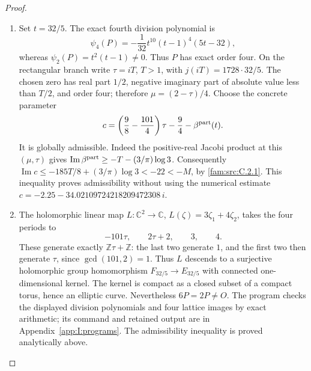 \begin{proof}
\begin{enumerate}[label=\arabic*.,leftmargin=*]
\item Set \(t=32/5\). The exact fourth division polynomial is
\[
 \psi_4(P)=-\frac1{32}t^{10}(t-1)^4(5t-32),
\]
whereas \(\psi_2(P)=t^2(t-1)\ne0\). Thus \(P\) has exact order four.
On the rectangular branch write \(\tau=iT\), \(T>1\), with
\(j(iT)=1728\cdot32/5\). The chosen zero has real part \(1/2\), negative
imaginary part of absolute value less than \(T/2\), and order four;
therefore \(\mu=(2-\tau)/4\). Choose the concrete parameter
\[
 c=\left(\frac98-\frac{101}{4}\right)\tau-\frac94
       -\beta^{\rm part}(t).
\]
It is globally admissible. Indeed the positive-real Jacobi product at this
\((\mu,\tau)\) gives
\(\operatorname{Im}\beta^{\rm part}\geq-T-(3/\pi)\log3\).
Consequently
\(\operatorname{Im}c\leq-185T/8+(3/\pi)\log3<-22<-M\), by \ref{fam:src:C.2.1}.
This inequality proves admissibility without using the numerical estimate
\(c=-2.25-34.02109724218209472308\,i\).

\item The holomorphic linear map \(L:\mathbb C^2\to\mathbb C\),
\(L(\zeta)=3\zeta_1+4\zeta_2\), takes the four periods to
\[
 -101\tau,\qquad2\tau+2,\qquad3,\qquad4.
\]
These generate exactly \(\mathbb Z\tau+\mathbb Z\): the last two generate
\(1\), and the first two then generate \(\tau\), since
\(\gcd(101,2)=1\). Thus \(L\) descends to a surjective holomorphic group
homomorphism \(F_{32/5}\to E_{32/5}\) with connected one-dimensional
kernel. The kernel is compact as a closed subset of a compact torus,
hence an elliptic curve. Nevertheless \(6P=2P\ne O\).
The program  checks the displayed
division polynomials and four lattice images by exact arithmetic; its
command and retained output are in Appendix~\ref{app:I:programs}.
The admissibility inequality is proved analytically above.
\end{enumerate}
\end{proof}

